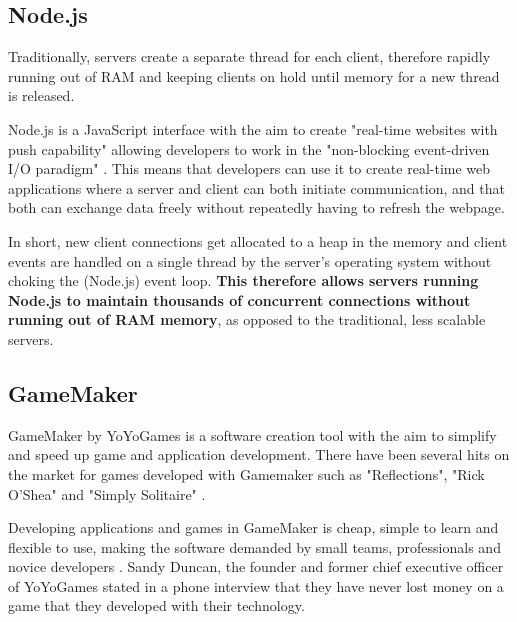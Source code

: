\documentclass[bsc,frontabs,twoside,singlespacing,parskip,deptreport]{infthesis}     %
\begin{document}
\subsection{Node.js}
Traditionally, servers create a separate thread for each client, therefore rapidly running out of RAM and keeping clients on hold until memory for a new thread is released\cite{Why_Nodejs}.

Node.js is a JavaScript interface with the aim to create "real-time websites with push capability" allowing developers to work in the "non-blocking event-driven I/O paradigm" \cite{Why_Nodejs}. This means that developers can use it to create real-time web applications where a server and client can both initiate communication, and that both can exchange data freely without repeatedly having to refresh the webpage.

In short, new client connections get allocated to a heap in the memory and client events are handled on a single thread by the server's operating system without choking the (Node.js) event loop. \textbf{This therefore allows servers running Node.js to maintain thousands of concurrent connections without running out of RAM memory}\cite{Node_Stress_Test}\cite{NodeJS_Image}, as opposed to the traditional, less scalable servers.


\subsection{GameMaker}
GameMaker by YoYoGames is a software creation tool with the aim to simplify and speed up game and application development. There have been several hits on the market for games developed with Gamemaker such as "Reflections", "Rick O'Shea" and "Simply Solitaire" \cite{Gamemaker_DnD}.

Developing applications and games in GameMaker is cheap, simple to learn and flexible to use, making the software demanded by small teams, professionals and novice developers \cite{Mark_Overmars}. Sandy Duncan, the founder and former chief executive officer of YoYoGames stated in a phone interview that they have never lost money on a game that they developed with their technology\cite{Gamemaker_DnD}.
\end{document}
